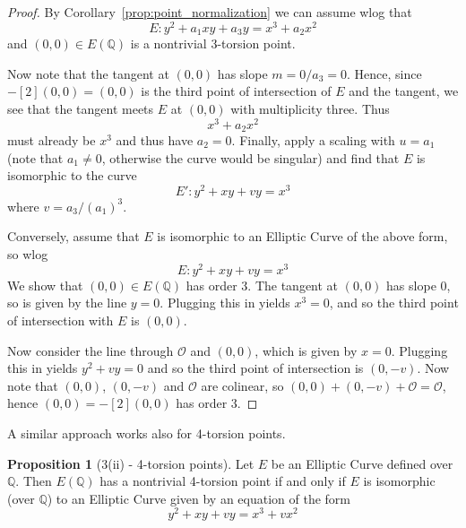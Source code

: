 \documentclass{scrartcl}
\newcommand{\Q}{\mathbb{Q}}
\renewcommand{\O}{\mathcal{O}}
\theoremstyle{definition}
\newtheorem{prop}[subsection]{Proposition}
\begin{document}
\begin{proof}
    By Corollary~\ref{prop:point_normalization} we can assume wlog that
    \begin{equation*}
        E: y^2 + a_1 x y + a_3 y = x^3 + a_2 x^2
    \end{equation*}
    and $(0, 0) \in E(\Q)$ is a nontrivial 3-torsion point.

    Now note that the tangent at $(0, 0)$ has slope $m = 0/a_3 = 0$.
    Hence, since $-[2](0, 0) = (0, 0)$ is the third point of intersection of $E$ and the tangent, we see that the tangent meets $E$ at $(0, 0)$ with multiplicity three.
    Thus
    \begin{equation*}
        x^3 + a_2 x^2 
    \end{equation*}
    must already be $x^3$ and thus have $a_2 = 0$.
    Finally, apply a scaling with $u = a_1$ (note that $a_1 \neq 0$, otherwise the curve would be singular) and find that $E$ is isomorphic to the curve
    \begin{equation*}
        E': y^2 + x y + v y = x^3
    \end{equation*}
    where $v = a_3 / (a_1)^3$.

    Conversely, assume that $E$ is isomorphic to an Elliptic Curve of the above form, so wlog
    \begin{equation*}
        E: y^2 + x y + v y = x^3
    \end{equation*}
    We show that $(0, 0) \in E(\Q)$ has order 3.
    The tangent at $(0, 0)$ has slope $0$, so is given by the line $y = 0$.
    Plugging this in yields $x^3 = 0$, and so the third point of intersection with $E$ is $(0, 0)$.
    
    Now consider the line through $\O$ and $(0, 0)$, which is given by $x = 0$.
    Plugging this in yields $y^2 + v y = 0$ and so the third point of intersection is $(0, -v)$.
    Now note that $(0, 0)$, $(0, -v)$ and $\O$ are colinear, so $(0, 0) + (0, -v) + \O = \O$, hence $(0, 0) = -[2](0, 0)$ has order 3.
\end{proof}
A similar approach works also for 4-torsion points.
\begin{prop}[3(ii) - 4-torsion points]
    Let $E$ be an Elliptic Curve defined over $\Q$.
    Then $E(\Q)$ has a nontrivial 4-torsion point if and only if $E$ is isomorphic (over $\Q$) to an Elliptic Curve given by an equation of the form
    \begin{equation*}
        y^2 + x y + v y = x^3 + v x^2
    \end{equation*}
\end{prop}
\end{document}
